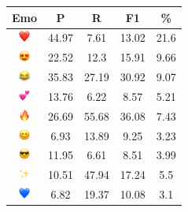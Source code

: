 \documentclass{article}
\begin{document}
\begin{table}
\centering
\begin{tabular}{|c|ccc|c|} \hline
\textbf{Emo} & \textbf{P} & \textbf{R} & \textbf{F1} & \textbf{\%} \\ \hline
\includegraphics[height=0.37cm,width=0.37cm]{img/red_heart.png} & 44.97 & 7.61 & 13.02 & 21.6\\ 
\includegraphics[height=0.37cm,width=0.37cm]{img/smiling_face_with_hearteyes.png} & 22.52 & 12.3 & 15.91 & 9.66\\ 
\includegraphics[height=0.37cm,width=0.37cm]{img/face_with_tears_of_joy.png} & 35.83 & 27.19 & 30.92 & 9.07\\ 
\includegraphics[height=0.37cm,width=0.37cm]{img/two_hearts.png} & 13.76 & 6.22 & 8.57 & 5.21\\ 
\includegraphics[height=0.37cm,width=0.37cm]{img/fire.png} & 26.69 & 55.68 & 36.08 & 7.43\\ 
\includegraphics[height=0.37cm,width=0.37cm]{img/smiling_face_with_smiling_eyes.png} & 6.93 & 13.89 & 9.25 & 3.23\\ 
\includegraphics[height=0.37cm,width=0.37cm]{img/smiling_face_with_sunglasses.png} & 11.95 & 6.61 & 8.51 & 3.99\\ 
\includegraphics[height=0.37cm,width=0.37cm]{img/sparkles.png} & 10.51 & 47.94 & 17.24 & 5.5\\ 
\includegraphics[height=0.37cm,width=0.37cm]{img/blue_heart.png} & 6.82 & 19.37 & 10.08 & 3.1\\ 

\end{tabular}
\end{table}
\end{document}
